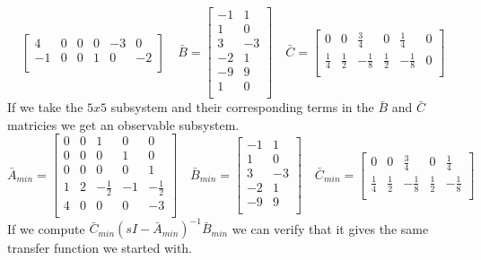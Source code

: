 \documentclass{article}
\begin{document}
\begin{enumerate}[(a)]
$$\begin{bmatrix}
4 & 0 & 0 & 0 & -3 & 0 \\
-1 & 0 & 0 & 1 & 0 & -2 \\
\end{bmatrix}
\quad
\bar{B} =
\begin{bmatrix}
-1 & 1 \\
 1 & 0 \\
 3 & -3 \\
-2 & 1 \\
-9 & 9 \\
 1 & 0 \\
\end{bmatrix}
\quad
\bar{C} =
\begin{bmatrix}
0 & 0 & \frac{3}{4} & 0 & \frac{1}{4} & 0 \\
\frac{1}{4} & \frac{1}{2} & -\frac{1}{8} & \frac{1}{2} & -\frac{1}{8} & 0 \\
\end{bmatrix}
$$
If we take the $5x5$ subsystem and their corresponding terms in the $\bar{B}$ and $\bar{C}$ matricies we get an observable subsystem.
$$
\bar{A}_{min} =
\begin{bmatrix}
0 & 0 & 1 & 0 & 0 \\
0 & 0 & 0 & 1 & 0 \\
0 & 0 & 0 & 0 & 1 \\
1 & 2 & -\frac{1}{2} & -1 & -\frac{1}{2} \\
4 & 0 & 0 & 0 & -3 \\
\end{bmatrix}
\quad
\bar{B}_{min} =
\begin{bmatrix}
-1 & 1 \\
 1 & 0 \\
 3 & -3 \\
-2 & 1 \\
-9 & 9 \\
\end{bmatrix}
\quad
\bar{C}_{min} =
\begin{bmatrix}
0 & 0 & \frac{3}{4} & 0 & \frac{1}{4} \\
\frac{1}{4} & \frac{1}{2} & -\frac{1}{8} & \frac{1}{2} & -\frac{1}{8} \\
\end{bmatrix}
$$
If we compute $\bar{C}_{min}\left(s I - \bar{A}_{min} \right)^{-1}\bar{B}_{min}$ we can verify that it gives the same transfer function we started with.


\end{enumerate}
\end{document}
